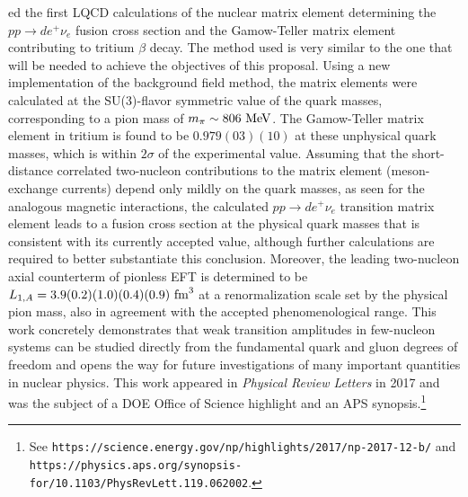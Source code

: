 ed the first LQCD calculations of the nuclear matrix element determining the $pp\rightarrow d e^+\nu_e$ fusion cross section and the Gamow-Teller matrix element contributing to tritium $\beta$ decay. The method used is very similar to the one that will be needed to achieve the objectives of this proposal.
Using a new implementation of the background field method,
the matrix elements were calculated at the SU(3)-flavor symmetric 
value of the quark masses, corresponding to a pion mass of $m_\pi\sim 806~{\rm MeV}$. 
The Gamow-Teller matrix element in tritium is found to be $0.979(03)(10)$ at these unphysical quark masses, 
which is within $2\sigma$ of the experimental value. 
Assuming that the short-distance correlated two-nucleon contributions to the matrix element 
(meson-exchange currents) depend only mildly on the quark masses, as seen for the analogous magnetic interactions, 
the calculated $pp\rightarrow d e^+\nu_e$ transition matrix element leads to a fusion cross section at the physical quark 
masses that is consistent with its currently accepted value, although further calculations are required to  better substantiate this conclusion. Moreover, the leading two-nucleon axial counterterm of pionless EFT is determined to 
be $L_{1,A} = 3.9(0.2)(1.0)(0.4)(0.9)~{\rm fm}^3$ at a renormalization scale set by the physical pion mass, 
also in agreement with the accepted phenomenological range. 
This work concretely demonstrates that weak transition amplitudes in few-nucleon systems can be studied directly 
from the fundamental quark and gluon degrees of freedom and  
opens the way for future investigations of many important quantities in nuclear physics. 
This work appeared in {\it Physical Review Letters} \cite{Savage:2016kon} in 2017 and was the subject of a DOE Office of Science highlight and an APS synopsis.\footnote{See {\tt https://science.energy.gov/np/highlights/2017/np-2017-12-b/} and \\{\tt https://physics.aps.org/synopsis-for/10.1103/PhysRevLett.119.062002}.}








